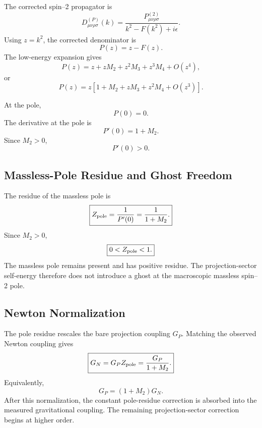 \documentclass[11pt]{article}
\begin{document}
The corrected spin--2 propagator is
\begin{equation}
\boxed{
D_{\mu\nu\rho\sigma}^{(P)}(k)
=
\frac{
P_{\mu\nu\rho\sigma}^{(2)}
}{
k^2-F(k^2)+i\epsilon
}.
}
\end{equation}
Using \(z=k^2\), the corrected denominator is
\begin{equation}
P(z)
=
z-F(z).
\end{equation}
The low-energy expansion gives
\begin{equation}
P(z)
=
z
+
zM_2
+
z^2M_3
+
z^3M_4
+
O(z^4),
\end{equation}
or
\begin{equation}
\boxed{
P(z)
=
z
\left[
1+M_2+zM_3+z^2M_4+O(z^3)
\right].
}
\end{equation}

At the pole,
\begin{equation}
\boxed{
P(0)=0.
}
\end{equation}
The derivative at the pole is
\begin{equation}
\boxed{
P'(0)=1+M_2.
}
\end{equation}
Since \(M_2>0\),
\begin{equation}
\boxed{
P'(0)>0.
}
\end{equation}

\subsection{Massless-Pole Residue and Ghost Freedom}

The residue of the massless pole is
\begin{equation}
\boxed{
Z_{\rm pole}
=
\frac{1}{P'(0)}
=
\frac{1}{1+M_2}.
}
\end{equation}
Since \(M_2>0\),
\begin{equation}
\boxed{
0<Z_{\rm pole}<1.
}
\end{equation}
The massless pole remains present and has positive residue. The projection-sector
self-energy therefore does not introduce a ghost at the macroscopic massless
spin--2 pole.

\subsection{Newton Normalization}

The pole residue rescales the bare projection coupling \(G_P\). Matching the
observed Newton coupling gives
\begin{equation}
\boxed{
G_N
=
G_PZ_{\rm pole}
=
\frac{G_P}{1+M_2}.
}
\end{equation}
Equivalently,
\begin{equation}
\boxed{
G_P
=
(1+M_2)G_N.
}
\end{equation}
After this normalization, the constant pole-residue correction is absorbed into
the measured gravitational coupling. The remaining projection-sector correction
begins at higher order.
\end{document}
